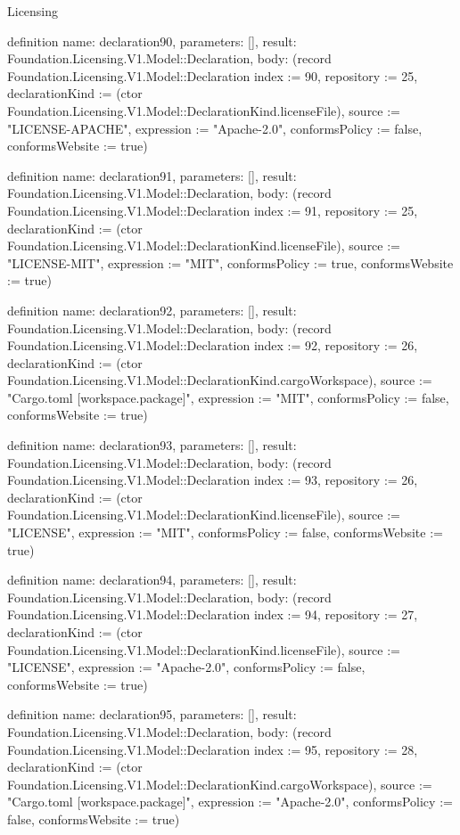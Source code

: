 \begin{lexlean}{Licensing}
\begin{semanticmodule}
definition{
  name: declaration90,
  parameters: [],
  result: Foundation.Licensing.V1.Model::Declaration,
  body: (record Foundation.Licensing.V1.Model::Declaration {index := 90, repository := 25, declarationKind := (ctor Foundation.Licensing.V1.Model::DeclarationKind.licenseFile), source := "LICENSE-APACHE", expression := "Apache-2.0", conformsPolicy := false, conformsWebsite := true})
}

definition{
  name: declaration91,
  parameters: [],
  result: Foundation.Licensing.V1.Model::Declaration,
  body: (record Foundation.Licensing.V1.Model::Declaration {index := 91, repository := 25, declarationKind := (ctor Foundation.Licensing.V1.Model::DeclarationKind.licenseFile), source := "LICENSE-MIT", expression := "MIT", conformsPolicy := true, conformsWebsite := true})
}

definition{
  name: declaration92,
  parameters: [],
  result: Foundation.Licensing.V1.Model::Declaration,
  body: (record Foundation.Licensing.V1.Model::Declaration {index := 92, repository := 26, declarationKind := (ctor Foundation.Licensing.V1.Model::DeclarationKind.cargoWorkspace), source := "Cargo.toml [workspace.package]", expression := "MIT", conformsPolicy := false, conformsWebsite := true})
}

definition{
  name: declaration93,
  parameters: [],
  result: Foundation.Licensing.V1.Model::Declaration,
  body: (record Foundation.Licensing.V1.Model::Declaration {index := 93, repository := 26, declarationKind := (ctor Foundation.Licensing.V1.Model::DeclarationKind.licenseFile), source := "LICENSE", expression := "MIT", conformsPolicy := false, conformsWebsite := true})
}

definition{
  name: declaration94,
  parameters: [],
  result: Foundation.Licensing.V1.Model::Declaration,
  body: (record Foundation.Licensing.V1.Model::Declaration {index := 94, repository := 27, declarationKind := (ctor Foundation.Licensing.V1.Model::DeclarationKind.licenseFile), source := "LICENSE", expression := "Apache-2.0", conformsPolicy := false, conformsWebsite := true})
}

definition{
  name: declaration95,
  parameters: [],
  result: Foundation.Licensing.V1.Model::Declaration,
  body: (record Foundation.Licensing.V1.Model::Declaration {index := 95, repository := 28, declarationKind := (ctor Foundation.Licensing.V1.Model::DeclarationKind.cargoWorkspace), source := "Cargo.toml [workspace.package]", expression := "Apache-2.0", conformsPolicy := false, conformsWebsite := true})
}


\end{semanticmodule}
\end{lexlean}

